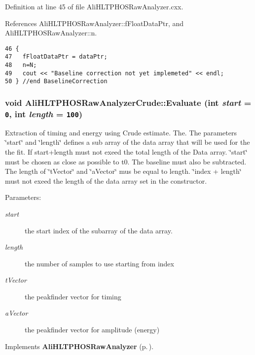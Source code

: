 Definition at line 45 of file Ali\-HLTPHOSRaw\-Analyzer.cxx.

References Ali\-HLTPHOSRaw\-Analyzer::f\-Float\-Data\-Ptr, and Ali\-HLTPHOSRaw\-Analyzer::n.

\footnotesize\begin{verbatim}46 {
47   fFloatDataPtr = dataPtr;  
48   n=N;
49   cout << "Baseline correction not yet implemeted" << endl;
50 } //end BaselineCorrection
\end{verbatim}\normalsize 


\subsubsection{\setlength{\rightskip}{0pt plus 5cm}void Ali\-HLTPHOSRaw\-Analyzer\-Crude::Evaluate (int {\em start} = {\tt 0}, int {\em length} = {\tt 100})\hspace{0.3cm}{\tt  [virtual]}}\label{classAliHLTPHOSRawAnalyzerCrude_AliHLTPHOSRawAnalyzerCrudea4}


Extraction of timing and energy using Crude estimate. The. The parameters \char`\"{}start\char`\"{} and \char`\"{}length\char`\"{} defines a sub array of the data array that will be used for the the fit. If start+length must not exeed the total length of the Data array. \char`\"{}start\char`\"{} must be chosen as close as possible to t0. The baseline must also be subtracted. The length of \char`\"{}t\-Vector\char`\"{} and \char`\"{}a\-Vector\char`\"{} mus be equal to length. \char`\"{}index + length\char`\"{} must not exeed the length of the data array set in the constructor. \begin{Desc}
\item[Parameters:]
\begin{description}
\item[{\em start}]the start index of the subarray of the data array. \item[{\em length}]the number of samples to use starting from index \item[{\em t\-Vector}]the peakfinder vector for timing \item[{\em a\-Vector}]the peakfinder vector for amplitude (energy) \end{description}
\end{Desc}


Implements {\bf Ali\-HLTPHOSRaw\-Analyzer} {\rm (p.\,\pageref{classAliHLTPHOSRawAnalyzer_AliHLTPHOSRawAnalyzera14})}.

